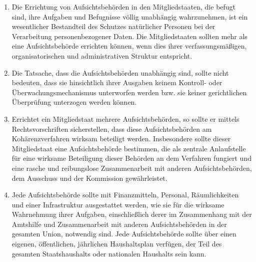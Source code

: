 \begin{enumerate}

   \item Die Errichtung von Aufsichtsbehörden in den Mitgliedstaaten, die befugt sind, ihre Aufgaben und Befugnisse
    völlig unabhängig wahrzunehmen, ist ein wesentlicher Bestandteil des Schutzes natürlicher Personen bei der
    Verarbeitung personenbezogener Daten. Die Mitgliedstaaten sollten mehr als eine Aufsichtsbehörde errichten können,
    wenn dies ihrer verfassungsmäßigen, organisatorischen und administrativen Struktur entspricht.%
   \label{eg:117}
   

   \item Die Tatsache, dass die Aufsichtsbehörden unabhängig sind, sollte nicht bedeuten, dass sie hinsichtlich ihrer
    Ausgaben keinem Kontroll- oder Überwachungsmechanismus unterworfen werden bzw. sie keiner gerichtlichen Überprüfung
    unterzogen werden können.%
   \label{eg:118}
   

   \item Errichtet ein Mitgliedstaat mehrere Aufsichtsbehörden, so sollte er mittels Rechtsvorschriften sicherstellen,
    dass diese Aufsichtsbehörden am Kohärenzverfahren wirksam beteiligt werden. Insbesondere sollte dieser
    Mitgliedstaat eine Aufsichtsbehörde bestimmen, die als zentrale Anlaufstelle für eine wirksame Beteiligung dieser
    Behörden an dem Verfahren fungiert und eine rasche und reibungslose Zusammenarbeit mit anderen Aufsichtsbehörden,
    dem Ausschuss und der Kommission gewährleistet.%
   \label{eg:119}
   

   \item Jede Aufsichtsbehörde sollte mit Finanzmitteln, Personal, Räumlichkeiten und einer Infrastruktur ausgestattet
    werden, wie sie für die wirksame Wahrnehmung ihrer Aufgaben, einschließlich derer im Zusammenhang mit der Amtshilfe
    und Zusammenarbeit mit anderen Aufsichtsbehörden in der gesamten Union, notwendig sind. Jede Aufsichtsbehörde
    sollte über einen eigenen, öffentlichen, jährlichen Haushaltsplan verfügen, der Teil des gesamten Staatshaushalts
    oder nationalen Haushalts sein kann.%
   \label{eg:120}
   


\end{enumerate}

